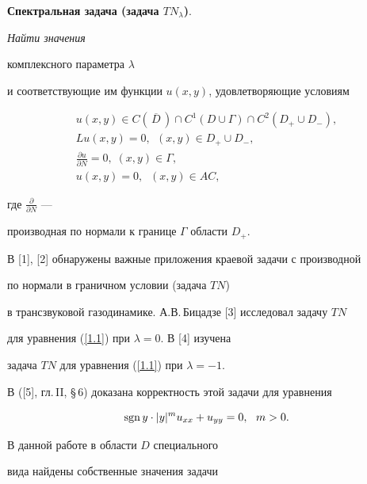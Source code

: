 {\bf Спектральная задача (задача $TN_\lambda$)}. {\it Найти значения 


комплексного параметра $\lambda$


и соответствующие им функции $u(x,y)$, удовлетворяющие условиям


\begin{gather}


u(x,y)\in {C}(\,\overline D\,)\cap


{C}^1(D\cup\Gamma)\cap {C}^2


(D_+\cup D_-),\label{1.2} \\


%


Lu(x,y)=0,\ \ (x,y)\in D_+\cup D_-,\label{1.3} \\


%


\frac{\partial u}{\partial N} =0,\;(x,y)\in\Gamma,\label{1.5} \\


%


u(x,y)=0,\;\;(x,y)\in AC,\label{1.4}


\end{gather}


где ${\frac{\partial}{\partial N}}$ ---


производная по нормали к границе $\Gamma$ области $D_+$.


}


\medskip





В [1], [2] обнаружены важные приложения краевой задачи с производной 


по нормали в граничном условии (задача $TN$) 


в трансзвуковой газодинамике. А.В.\,Бицадзе [3] исследовал задачу $TN$ 


для уравнения (\ref{1.1}) при $\lambda =0$. В [4] изучена 


задача $TN$ для уравнения (\ref{1.1}) при $\lambda =-1$.


В ([5], гл.\,II, \S\,6) доказана корректность этой задачи для уравнения 


$$


\sgn y\cdot| y|^mu_{xx}+ u_{yy}=0,\ \ m>0.


$$





В данной работе в области $D$ специального 


вида найдены собственные значения задачи 


